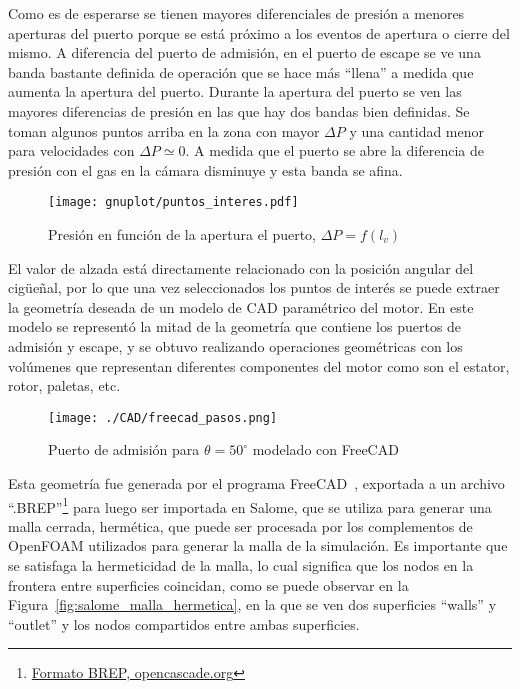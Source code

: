 Como es de esperarse se tienen mayores diferenciales de presión a menores
aperturas del puerto porque se está próximo a los eventos de apertura o cierre
del mismo.
%
A diferencia del puerto de admisión, en el puerto de escape se ve una banda
bastante definida de operación que se hace más ``llena'' a medida que aumenta la
apertura del puerto.
%
Durante la apertura del puerto se ven las mayores diferencias de presión en las
que hay dos bandas bien definidas.
%
Se toman algunos puntos arriba en la zona con mayor $\Delta P$ y una cantidad
menor para velocidades con $\Delta P \simeq 0$.
%
A medida que el puerto se abre la diferencia de presión con el gas en la cámara
disminuye y esta banda se afina.

\begin{figure}[h!]
    \centering
    \texttt{[image: gnuplot/puntos\_interes.pdf]}
    \caption{Presión en función de la apertura el puerto,
$\Delta P = f(l_{v})$}\label{fig:puntos_interes}
\end{figure}

El valor de alzada está directamente relacionado con la posición angular del
cigüeñal, por lo que una vez seleccionados los puntos de interés se puede
extraer la geometría deseada de un modelo de CAD paramétrico del motor.
%
En este modelo se representó la mitad de la geometría que contiene los puertos
de admisión y escape, y se obtuvo realizando operaciones geométricas con los
volúmenes que representan diferentes componentes del motor como son el estator,
rotor, paletas, etc.


\begin{figure}[h!]
    \centering
    \texttt{[image: ./CAD/freecad\_pasos.png]}
    \caption{Puerto de admisión para $\theta=50^{\circ}$ modelado con
FreeCAD}\label{fig:admision_50}
\end{figure}

Esta geometría fue generada por el programa FreeCAD~\parencite{freecad},
exportada a un archivo
``.BREP''\footnote{\href{https://dev.opencascade.org/doc/overview/html/specification\_\_brep\_format.html}{Formato
BREP, opencascade.org}} para luego ser importada en Salome\parencite{salome},
que se utiliza para generar una malla cerrada, hermética, que puede ser
procesada por los complementos de OpenFOAM utilizados para generar la malla de
la simulación.
%
Es importante que se satisfaga la hermeticidad de la malla, lo cual significa
que los nodos en la frontera entre superficies coincidan, como se puede observar
en la Figura~\ref{fig:salome_malla_hermetica}, en la que se ven dos superficies
``walls'' y ``outlet'' y los nodos compartidos entre ambas superficies.
%

